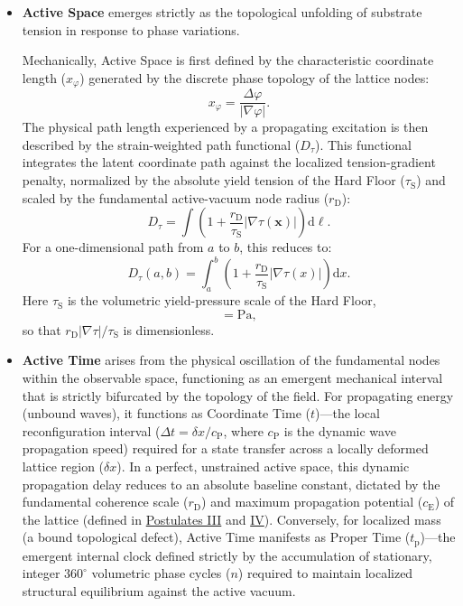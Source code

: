 \begin{itemize}
    \item \textbf{Active Space} emerges strictly as the topological unfolding of substrate tension in response to phase variations.

    Mechanically, Active Space is first defined by the characteristic coordinate length ($x_\varphi$) generated by the discrete phase topology of the lattice nodes:
    \begin{equation}
        x_\varphi = \frac{\Delta\varphi}{|\nabla\varphi|}.
    \end{equation}
    The physical path length experienced by a propagating excitation is then described by the strain-weighted path functional ($D_\tau$). This functional integrates the latent coordinate path against the localized tension-gradient penalty, normalized by the absolute yield tension of the Hard Floor ($\tau_{\mathrm{S}}$) and scaled by the fundamental active-vacuum node radius ($r_{\mathrm{D}}$):
    \begin{equation}
        D_\tau = \int \left( 1 + \frac{r_{\mathrm{D}}}{\tau_{\mathrm{S}}} |\nabla\tau(\mathbf{x})| \right) \mathrm{d}\ell .
    \end{equation}
    For a one-dimensional path from $a$ to $b$, this reduces to:
    \begin{equation}
        D_\tau(a,b) = \int_a^b \left( 1 + \frac{r_{\mathrm{D}}}{\tau_{\mathrm{S}}} |\nabla\tau(x)| \right) \mathrm{d}x .
    \end{equation}
    Here \(\tau_{\mathrm S}\) is the volumetric yield-pressure scale of the Hard Floor,
    \begin{equation}
        [\tau_{\mathrm S}] = \mathrm{Pa},
    \end{equation}
    so that \(r_{\mathrm D}|\nabla\tau|/\tau_{\mathrm S}\) is dimensionless.

    \item \textbf{Active Time} arises from the physical oscillation of the fundamental nodes within the observable space, functioning as an emergent mechanical interval that is strictly bifurcated by the topology of the field. For propagating energy (unbound waves), it functions as Coordinate Time ($t$)---the local reconfiguration interval ($\Delta t = \delta x / c_{\mathrm{P}}$, where $c_{\mathrm{P}}$ is the dynamic wave propagation speed) required for a state transfer across a locally deformed lattice region ($\delta x$). In a perfect, unstrained active space, this dynamic propagation delay reduces to an absolute baseline constant, dictated by the fundamental coherence scale ($r_{\mathrm{D}}$) and maximum propagation potential ($c_{\mathrm{E}}$) of the lattice (defined in \hyperref[postulate:three]{Postulates III} and \hyperref[postulate:four]{IV}). Conversely, for localized mass (a bound topological defect), Active Time manifests as Proper Time ($t_{\mathrm{p}}$)---the emergent internal clock defined strictly by the accumulation of stationary, integer $360^{\circ}$ volumetric phase cycles ($n$) required to maintain localized structural equilibrium against the active vacuum.


\end{itemize}
